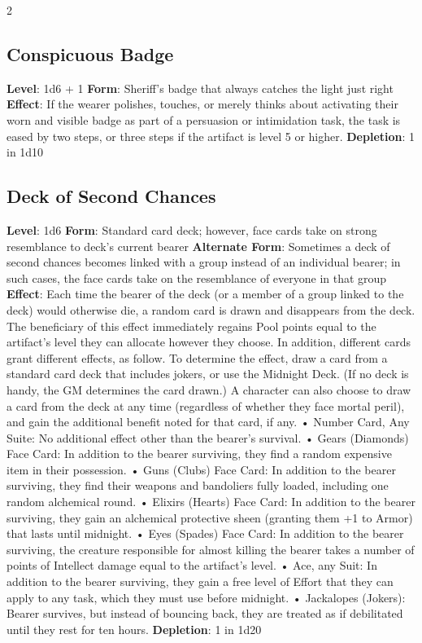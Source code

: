 \begin{multicols}{2}

\subsection{Conspicuous Badge}
\textbf{Level}: 1d6 + 1 
\textbf{Form}: Sheriff’s badge that always catches the light just right 
\textbf{Effect}: If the wearer polishes, touches, or merely thinks about activating their worn and visible badge as part of a persuasion or intimidation task, the task is eased by two steps, or three steps if the artifact is level 5 or higher. 
\textbf{Depletion}: 1 in 1d10 

\subsection{Deck of Second Chances }
\textbf{Level}: 1d6 
\textbf{Form}: Standard card deck; however, face cards take on strong resemblance to deck’s current bearer 
\textbf{Alternate Form}: Sometimes a deck of second chances becomes linked with a group instead of an individual bearer; in such cases, the face cards take on the resemblance of everyone in that group 
\textbf{Effect}: Each time the bearer of the deck (or a member of a group linked to the deck) would otherwise die, a random card is drawn and disappears from the deck. The beneficiary of this effect immediately regains Pool points equal to the artifact’s level they can allocate however they choose. 
In addition, different cards grant different effects, as follow. To determine the effect, draw a card from a standard card deck that includes jokers, or use the Midnight Deck. (If no deck is handy, the GM determines the card drawn.) 
A character can also choose to draw a card from the deck at any time (regardless of whether they face mortal peril), and gain the additional benefit noted for that card, if any. 
    • Number Card, Any Suite: No additional effect other than the bearer’s survival. 
    • Gears (Diamonds) Face Card: In addition to the bearer surviving, they find a random expensive item in their possession. 
    • Guns (Clubs) Face Card: In addition to the bearer surviving, they find their weapons and bandoliers fully loaded, including one random alchemical round. 
    • Elixirs (Hearts) Face Card: In addition to the bearer surviving, they gain an alchemical protective sheen (granting them +1 to Armor) that lasts until midnight.
    • Eyes (Spades) Face Card: In addition to the bearer surviving, the creature responsible for almost killing the bearer takes a number of points of Intellect damage equal to the artifact’s level. 
    • Ace, any Suit: In addition to the bearer surviving, they gain a free level of Effort that they can apply to any task, which they must use before midnight. 
    • Jackalopes (Jokers): Bearer survives, but instead of bouncing back, they are treated as if debilitated until they rest for ten hours. 
\textbf{Depletion}: 1 in 1d20


\end{multicols}
